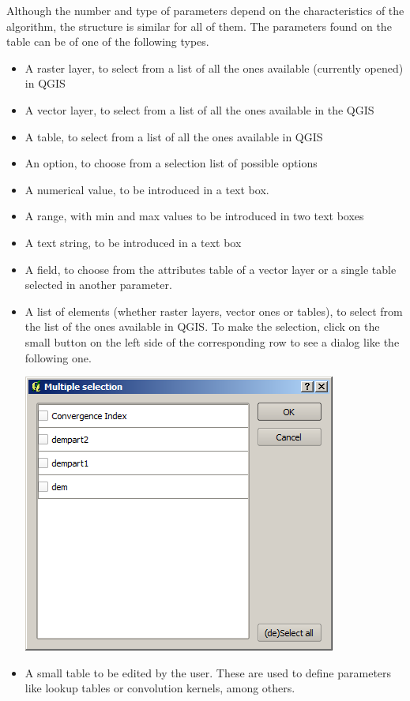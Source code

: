 Although the number and type of parameters depend on the characteristics of the algorithm, the structure is similar for all of them. The parameters found on the table can be of one of the following types.

\begin{itemize}
	\item A raster layer, to select from a list of all the ones available (currently opened) in QGIS
	\item A vector layer, to select from a list of all the ones available in the QGIS
	\item A table, to select from a list of all the ones available in QGIS
	\item An option, to choose from a selection list of possible options
	\item A numerical value, to be introduced in a text box. 
	\item A range, with min and max values to be introduced in two text boxes
	\item A text string, to be introduced in a text box
	\item A field, to choose from the attributes table of a vector layer or a single table selected in another parameter.
	\item A list of elements (whether raster layers, vector ones or tables), to select from the list of the ones available in QGIS. To make the selection, click on the small button on the left side of the corresponding row to see a dialog like the following one.
		\begin{center}
		\includegraphics[width=.6\columnwidth]{multiple_selection.png}
		\end{center}		
	\item A small table to be edited by the user. These are used to define parameters like lookup tables or convolution kernels, among others.


\end{itemize}
